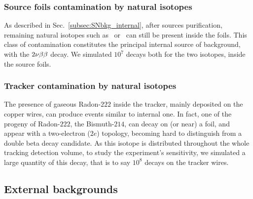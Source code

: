 \subsubsection*{Source foils contamination by natural isotopes}

As described in Sec.~\ref{subsec:SNbkg_internal}, after sources purification, remaining natural isotopes such as \Tl\ or \Bi\ can still be present inside the foils.
This class of contamination constitutes the principal internal source of background, with the $2\nu\beta\beta$ decay.
We simulated $10^{7}$ decays both for the two isotopes, inside the source foils.

\subsubsection{Tracker contamination by natural isotopes}

The presence of gaseous Radon-$222$ inside the tracker, mainly deposited on the copper wires, can produce events similar to internal one.
In fact, one of the progeny of Radon-$222$, the Bismuth-$214$, can decay on (or near) a foil, and appear with a two-electron ($2e$) topology, becoming hard to distinguish from a double beta decay candidate.
As this isotope is distributed throughout the whole tracking detection volume, to study the experiment's sensitivity, we simulated a large quantity of this decay, that is to say $10^8$ decays on the tracker wires.


\subsection{External backgrounds}

